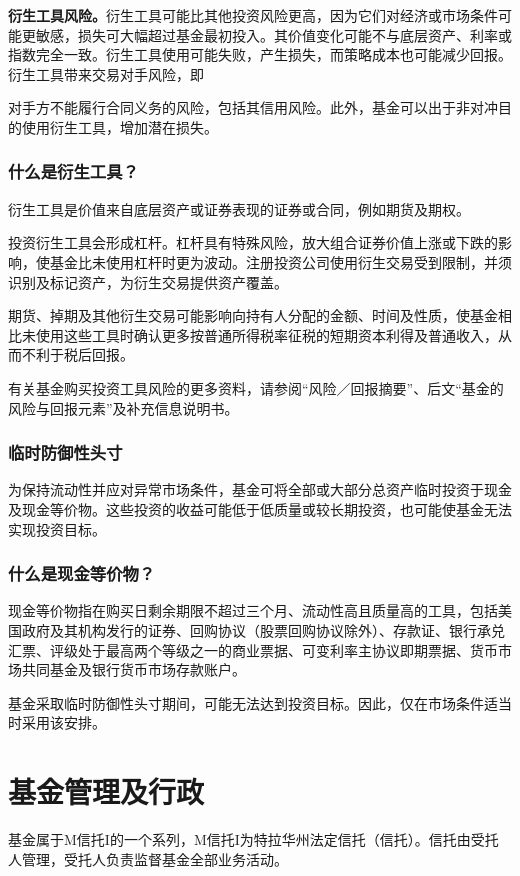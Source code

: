\documentclass[UTF8,fontset=none,11pt,a4paper]{ctexart}
\begin{document}
\textbf{衍生工具风险。}衍生工具可能比其他投资风险更高，因为它们对经济或市场条件可能更敏感，损失可大幅超过基金最初投入。其价值变化可能不与底层资产、利率或指数完全一致。衍生工具使用可能失败，产生损失，而策略成本也可能减少回报。衍生工具带来交易对手风险，即

对手方不能履行合同义务的风险，包括其信用风险。此外，基金可以出于非对冲目的使用衍生工具，增加潜在损失。

\subsubsection*{什么是衍生工具？}
衍生工具是价值来自底层资产或证券表现的证券或合同，例如期货及期权。


投资衍生工具会形成杠杆。杠杆具有特殊风险，放大组合证券价值上涨或下跌的影响，使基金比未使用杠杆时更为波动。注册投资公司使用衍生交易受到限制，并须识别及标记资产，为衍生交易提供资产覆盖。

期货、掉期及其他衍生交易可能影响向持有人分配的金额、时间及性质，使基金相比未使用这些工具时确认更多按普通所得税率征税的短期资本利得及普通收入，从而不利于税后回报。

有关基金购买投资工具风险的更多资料，请参阅“风险／回报摘要”、后文“基金的风险与回报元素”及补充信息说明书。

\subsubsection*{临时防御性头寸}\label{unitU278}
为保持流动性并应对异常市场条件，基金可将全部或大部分总资产临时投资于现金及现金等价物。这些投资的收益可能低于低质量或较长期投资，也可能使基金无法实现投资目标。

\subsubsection*{什么是现金等价物？}
现金等价物指在购买日剩余期限不超过三个月、流动性高且质量高的工具，包括美国政府及其机构发行的证券、回购协议（股票回购协议除外）、存款证、银行承兑汇票、评级处于最高两个等级之一的商业票据、可变利率主协议即期票据、货币市场共同基金及银行货币市场存款账户。


基金采取临时防御性头寸期间，可能无法达到投资目标。因此，仅在市场条件适当时采用该安排。


\par{}\label{originalpage6}
\section*{基金管理及行政}\label{unitU285}
基金属于M信托I的一个系列，M信托I为特拉华州法定信托（信托）。信托由受托人管理，受托人负责监督基金全部业务活动。
\end{document}
